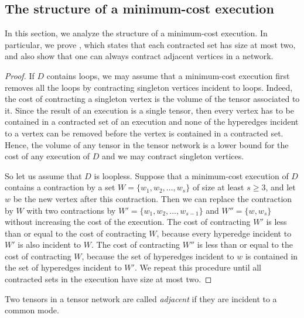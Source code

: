 \documentclass{toc}
\begin{document}
\subsection{The structure of a minimum-cost execution} \label{sect:structure_min_cost_execution}

In this section, we analyze the structure of a minimum-cost execution. In particular, we prove , which states that each contracted set has size at most two, and also show that one can always contract adjacent vertices in a network.

\BinaryExecutionLemma* \label{lem:binary_appendix}

\begin{proof}
If $D$ contains loops, we may assume that
a minimum-cost execution first removes all the loops by contracting singleton
vertices incident to loops. Indeed, the cost of contracting
a singleton vertex is the volume of the tensor associated to it. Since the result of an execution is a single tensor, then every vertex has to be contained in a contracted set of an execution and none of the hyperedges incident to a vertex can be removed before the vertex is contained in a contracted set. Hence, the volume of any tensor in the tensor network is a lower
bound for the cost of any execution of $D$ and we may contract singleton vertices.

So let us assume that $D$ is loopless.
Suppose that a minimum-cost execution of $D$ contains a contraction by
a set $W=\{w_1,w_2,\ldots,w_s\}$ of size at least $s\geq 3$, and let $w$ be the new vertex after this contraction. Then we can replace the contraction by $W$ with
two contractions by $W'=\{w_1,w_2,\ldots,w_{s-1}\}$ and $W''=\{w,w_s\}$ without increasing the
cost of the execution. The cost of contracting $W'$ is less than or equal to the cost of contracting $W$, because every hyperedge incident to $W'$ is also incident to $W$. The cost of contracting $W''$ is less than or equal to the cost of contracting $W$, because the set of hyperedges incident to $w$ is contained in the set of hyperedges incident to $W'$. We repeat this procedure until all contracted sets in the
execution have size at most two.
\end{proof}

Two tensors in a tensor network are called \emph{adjacent}
if they are incident to a common mode.
\end{document}
